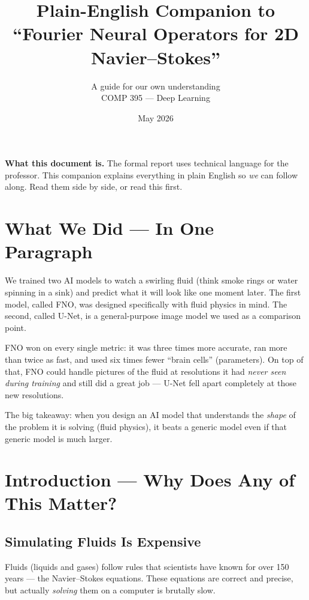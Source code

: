 \documentclass[11pt,twocolumn]{article}
\title{\textbf{Plain-English Companion to\\
       ``Fourier Neural Operators for 2D Navier--Stokes''}}
\author{
  A guide for our own understanding\\
  COMP 395 --- Deep Learning
}
\date{May 2026}
\begin{document}
\maketitle

\begin{infobox}
\textbf{What this document is.}
The formal report uses technical language for the professor.
This companion explains everything in plain English so \emph{we}
can follow along.
Read them side by side, or read this first.
\end{infobox}

\section*{What We Did --- In One Paragraph}

We trained two AI models to watch a swirling fluid (think smoke rings or water
spinning in a sink) and predict what it will look like one moment later.
The first model, called FNO, was designed specifically with fluid physics in mind.
The second, called U-Net, is a general-purpose image model we used as a
comparison point.

FNO won on every single metric: it was three times more accurate, ran more than
twice as fast, and used six times fewer ``brain cells'' (parameters).
On top of that, FNO could handle pictures of the fluid at resolutions it had
\emph{never seen during training} and still did a great job --- U-Net fell apart
completely at those new resolutions.

The big takeaway: when you design an AI model that understands the \emph{shape}
of the problem it is solving (fluid physics), it beats a generic model even if
that generic model is much larger.

\section{Introduction --- Why Does Any of This Matter?}

\subsection{Simulating Fluids Is Expensive}

Fluids (liquids and gases) follow rules that scientists have known for over 150
years --- the Navier--Stokes equations.
These equations are correct and precise, but actually \emph{solving} them
on a computer is brutally slow.
\end{document}
